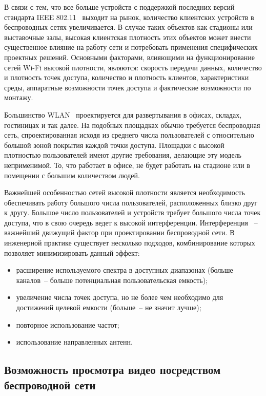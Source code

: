 В связи с тем, что все больше устройств с поддержкой последних версий стандарта IEEE 802.11~\cite{ieee_802.11} выходит на рынок, количество клиентских устройств в беспроводных сетях увеличивается. В случае таких объектов как стадионы или выставочные залы, высокая клиентская плотность этих объектов может внести существенное влияние на работу сети и потребовать применения специфических проектных решений. Основными факторами, влияющими на функционирование сетей Wi-Fi высокой плотности, являются: скорость передачи данных, количество и плотность точек доступа, количество и плотность клиентов, характеристики среды, аппаратные возможности точек доступа и фактические возможности по монтажу.

Большинство WLAN~\cite{what_is_wlan} проектируется для развертывания в офисах, складах, гостиницах и так далее. На подобных площадках обычно требуется беспроводная сеть, спроектированная исходя из среднего числа пользователей с относительно большой зоной покрытия каждой точки доступа. Площадки с высокой плотностью пользователей имеют другие требования, делающие эту модель неприменимой. То, что работает в офисе, не будет работать на стадионе или в помещении с большим количеством людей. 

Важнейшей особенностью сетей высокой плотности является необходимость обеспечивать работу большого числа пользователей, расположенных близко друг к другу. Большое число пользователей и устройств требует большого числа точек доступа, что в свою очередь ведет к высокой интерференции. Интерференция~\cite{interfer} – важнейший движущий фактор при проектировании беспроводной сети. В инженерной практике существует несколько подходов, комбинирование которых позволяет минимизировать данный эффект: 
\begin{itemize}
    \item расширение используемого спектра в доступных диапазонах (больше каналов~-- больше потенциальная пользовательская емкость);
    \item увеличение числа точек доступа, но не более чем необходимо для достижений целевой емкости (больше~-- не значит лучше);
    \item повторное использование частот;
    \item использование направленных антенн.
\end{itemize}

\subsection{Возможность просмотра видео посредством беспроводной сети}

